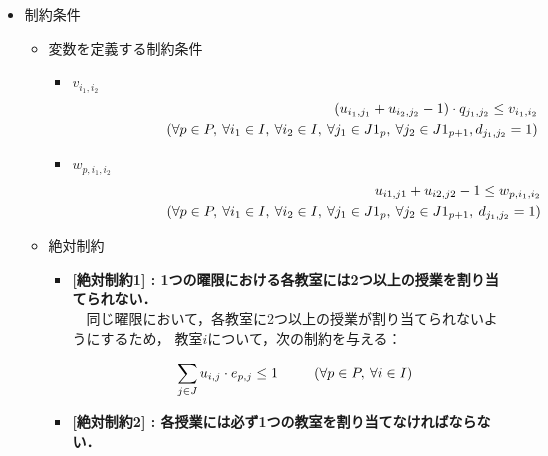 \documentclass[12pt, a4paper, fleqn]{jreport}
\begin{document}
\begin{itemize}
\item 制約条件
\begin{itemize}
\item{変数を定義する制約条件}
\begin{itemize}
\item $v_{i_1,i_2}$\\
\begin{eqnarray}
\label{shensu-1} 
&&( u_{i_1,j_1} + u_{i_2,j_2} - 1 ) \cdot q_{j_1,j_2} \leq v_{i_1,i_2}\\
&&\hspace{20.0mm} \left(\forall p \in P,\: \forall i_1 \in I,\: \forall i_2 \in I,\:\forall j_1 \in J1_p,\:\forall j_2 \in J1_{p+1},d_{j_1,j_2}=1\right)\nonumber 
\end{eqnarray}
\item $w_{p,i_1,i_2}$\\
\begin{eqnarray}
\label{shensu-2} 
&& u_{i1,j1} + u_{i2,j2} - 1  \leq w_{p,i_1,i_2}\\
&&\hspace{20.0mm} \left(\forall p \in P,\: \forall i_1 \in I,\:\forall i_2 \in I,\:\forall j_1 \in J1_{p},\:\forall j_2 \in J1_{p+1},\:d_{j_1,j_2}=1\right)\nonumber 
\end{eqnarray}
\end{itemize}
\vspace{3.0mm}
\item{絶対制約}\\
\vspace{-3.0mm}
\begin{itemize}
\item {\bf[絶対制約1] : 1つの曜限における各教室には2つ以上の授業を割り当てられない．}\\

\vspace{-5.0mm}
　同じ曜限において，各教室に2つ以上の授業が割り当てられないようにするため，
教室$i$について，次の制約を与える：

\vspace{-3.0mm}
\begin{eqnarray}
\label{szettai-1}
&&\sum_{j \in J} u_{i,j} \cdot e_{p,j} \leq 1 \hspace{5.0mm}
\quad \left (\forall p \in P, \:\forall i \in I \right)
\end{eqnarray} 

\vspace{5.0mm}
\item {\bf[絶対制約2] : 各授業には必ず1つの教室を割り当てなければならない．}\\


\end{itemize}
\end{itemize}
\end{itemize}
\end{document}
